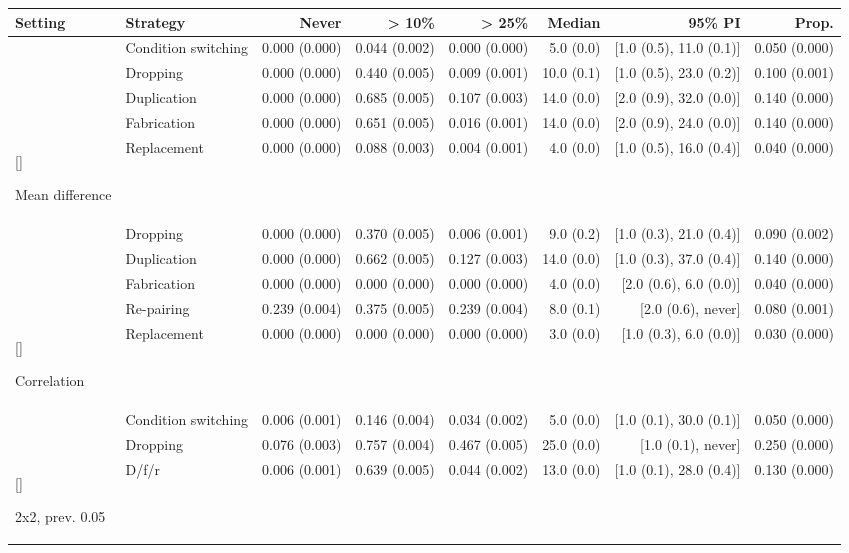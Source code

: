 \documentclass[
  nonatbib,
  authoryear,
  preprint]{elsarticle}
\begin{document}
\begin{landscape}
\begin{longtable}[t]{llrrrrrr}
\toprule
Setting & Strategy & Never & > 10\% & > 25\% & Median & 95\% PI & Prop.\\
\midrule
 & Condition switching & 0.000 (0.000) & 0.044 (0.002) & 0.000 (0.000) & 5.0 (0.0) & {}[1.0 (0.5), 11.0 (0.1)] & 0.050 (0.000)\\
\nopagebreak
 & Dropping & 0.000 (0.000) & 0.440 (0.005) & 0.009 (0.001) & 10.0 (0.1) & {}[1.0 (0.5), 23.0 (0.2)] & 0.100 (0.001)\\
\nopagebreak
 & Duplication & 0.000 (0.000) & 0.685 (0.005) & 0.107 (0.003) & 14.0 (0.0) & {}[2.0 (0.9), 32.0 (0.0)] & 0.140 (0.000)\\
\nopagebreak
 & Fabrication & 0.000 (0.000) & 0.651 (0.005) & 0.016 (0.001) & 14.0 (0.0) & {}[2.0 (0.9), 24.0 (0.0)] & 0.140 (0.000)\\
\nopagebreak
\multirow[t]{-4}{*}[\normalbaselineskip]{\raggedright\arraybackslash Mean difference} & Replacement & 0.000 (0.000) & 0.088 (0.003) & 0.004 (0.001) & 4.0 (0.0) & {}[1.0 (0.5), 16.0 (0.4)] & 0.040 (0.000)\\
\cmidrule{1-8}\pagebreak[0]
 & Dropping & 0.000 (0.000) & 0.370 (0.005) & 0.006 (0.001) & 9.0 (0.2) & {}[1.0 (0.3), 21.0 (0.4)] & 0.090 (0.002)\\
\nopagebreak
 & Duplication & 0.000 (0.000) & 0.662 (0.005) & 0.127 (0.003) & 14.0 (0.0) & {}[1.0 (0.3), 37.0 (0.4)] & 0.140 (0.000)\\
\nopagebreak
 & Fabrication & 0.000 (0.000) & 0.000 (0.000) & 0.000 (0.000) & 4.0 (0.0) & {}[2.0 (0.6), 6.0 (0.0)] & 0.040 (0.000)\\
\nopagebreak
 & Re-pairing & 0.239 (0.004) & 0.375 (0.005) & 0.239 (0.004) & 8.0 (0.1) & {}[2.0 (0.6), never] & 0.080 (0.001)\\
\nopagebreak
\multirow[t]{-4}{*}[\normalbaselineskip]{\raggedright\arraybackslash Correlation} & Replacement & 0.000 (0.000) & 0.000 (0.000) & 0.000 (0.000) & 3.0 (0.0) & {}[1.0 (0.3), 6.0 (0.0)] & 0.030 (0.000)\\
\cmidrule{1-8}\pagebreak[0]
 & Condition switching & 0.006 (0.001) & 0.146 (0.004) & 0.034 (0.002) & 5.0 (0.0) & {}[1.0 (0.1), 30.0 (0.1)] & 0.050 (0.000)\\
\nopagebreak
 & Dropping & 0.076 (0.003) & 0.757 (0.004) & 0.467 (0.005) & 25.0 (0.0) & {}[1.0 (0.1), never] & 0.250 (0.000)\\
\nopagebreak
\multirow[t]{-2}{*}[\normalbaselineskip]{\raggedright\arraybackslash 2x2, prev. 0.05} & D/f/r & 0.006 (0.001) & 0.639 (0.005) & 0.044 (0.002) & 13.0 (0.0) & {}[1.0 (0.1), 28.0 (0.4)] & 0.130 (0.000)\\

\end{longtable}
\end{landscape}
\end{document}

